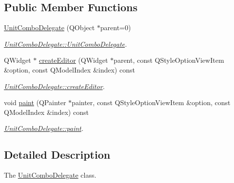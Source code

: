 \subsection*{Public Member Functions}
\begin{DoxyCompactItemize}
\item 
\hyperlink{classGui_1_1Widgets_1_1Delegates_1_1UnitComboDelegate_afd1dc5362c4ed8263354e80337d9958a}{Unit\-Combo\-Delegate} (Q\-Object $\ast$parent=0)
\begin{DoxyCompactList}\small\item\em \hyperlink{classGui_1_1Widgets_1_1Delegates_1_1UnitComboDelegate_afd1dc5362c4ed8263354e80337d9958a}{Unit\-Combo\-Delegate\-::\-Unit\-Combo\-Delegate}. \end{DoxyCompactList}\item 
Q\-Widget $\ast$ \hyperlink{classGui_1_1Widgets_1_1Delegates_1_1UnitComboDelegate_a246f92146bdf89200867629b68e3a86a}{create\-Editor} (Q\-Widget $\ast$parent, const Q\-Style\-Option\-View\-Item \&option, const Q\-Model\-Index \&index) const 
\begin{DoxyCompactList}\small\item\em \hyperlink{classGui_1_1Widgets_1_1Delegates_1_1UnitComboDelegate_a246f92146bdf89200867629b68e3a86a}{Unit\-Combo\-Delegate\-::create\-Editor}. \end{DoxyCompactList}\item 
void \hyperlink{classGui_1_1Widgets_1_1Delegates_1_1UnitComboDelegate_a2efed5aa3b9bde3cd80e9518cde00e60}{paint} (Q\-Painter $\ast$painter, const Q\-Style\-Option\-View\-Item \&option, const Q\-Model\-Index \&index) const 
\begin{DoxyCompactList}\small\item\em \hyperlink{classGui_1_1Widgets_1_1Delegates_1_1UnitComboDelegate_a2efed5aa3b9bde3cd80e9518cde00e60}{Unit\-Combo\-Delegate\-::paint}. \end{DoxyCompactList}\end{DoxyCompactItemize}


\subsection{Detailed Description}
The \hyperlink{classGui_1_1Widgets_1_1Delegates_1_1UnitComboDelegate}{Unit\-Combo\-Delegate} class. 

